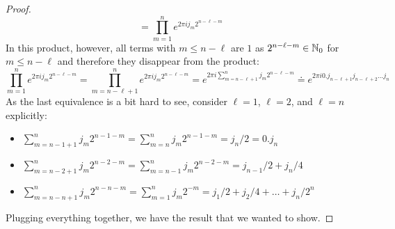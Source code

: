 \begin{proof}
\begin{equation}
						= \prod_{m = 1}^{n} e^{2 \pi i j_m 2^{n - \ell - m}}
				\end{equation}
				In this product, however, all terms with \( m \leq n - \ell \) are \(1\) as \( 2^{n - \ell - m} \in \mathbb{N}_0 \) for \( m \leq n - \ell \) and therefore they disappear from the product:
				\begin{equation}
					\prod_{m = 1}^{n} e^{2 \pi i j_m 2^{n - \ell - m}}
						= \prod_{m = n - \ell + 1}^{n} e^{2 \pi i j_m 2^{n - \ell - m}}
						 = e^{2 \pi i \sum_{m = n - \ell + 1}^{n} j_m 2^{n - \ell - m}}
						 \doteq e^{2 \pi i 0.j_{n - \ell + 1} j_{n - \ell + 2} \dots j_{n}}
				\end{equation}
				As the last equivalence is a bit hard to see, consider \(\ell = 1\), \(\ell = 2\), and \(\ell = n\) explicitly:
				\begin{itemize}
					\item \( \sum_{m = n - 1 + 1}^{n} j_m 2^{n - 1 - m} = \sum_{m = n}^{n} j_m 2^{n - 1 - m} = j_n / 2 = 0.j_n \)
					\item \( \sum_{m = n - 2 + 1}^{n} j_m 2^{n - 2 - m} = \sum_{m = n - 1}^{n} j_m 2^{n - 2 - m} = j_{n - 1} / 2 + j_n / 4 \)
					\item \( \sum_{m = n - n + 1}^{n} j_m 2^{n - n - m} = \sum_{m = 1}^{n} j_m 2^{-m} = j_1 / 2 + j_2 / 4 + \dots + j_n / 2^n \)
				\end{itemize}
				Plugging everything together, we have the result that we wanted to show.
			\end{proof}

